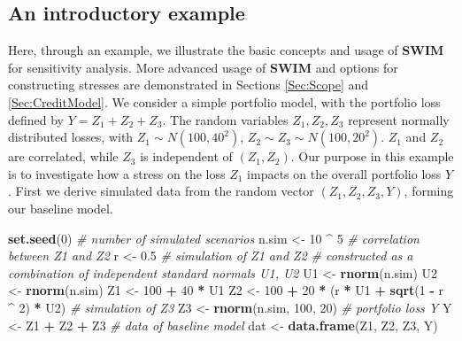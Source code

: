 \documentclass[
]{article}
\newenvironment{Shaded}{\begin{snugshade}}{\end{snugshade}}
\newcommand{\CommentTok}[1]{\textcolor[rgb]{0.56,0.35,0.01}{\textit{#1}}}
\newcommand{\DecValTok}[1]{\textcolor[rgb]{0.00,0.00,0.81}{#1}}
\newcommand{\FloatTok}[1]{\textcolor[rgb]{0.00,0.00,0.81}{#1}}
\newcommand{\KeywordTok}[1]{\textcolor[rgb]{0.13,0.29,0.53}{\textbf{#1}}}
\newcommand{\NormalTok}[1]{#1}
\newcommand{\OperatorTok}[1]{\textcolor[rgb]{0.81,0.36,0.00}{\textbf{#1}}}
\newcommand{\StringTok}[1]{\textcolor[rgb]{0.31,0.60,0.02}{#1}}
\begin{document}
\hypertarget{an-introductory-example}{%
\subsection{An introductory example}\label{an-introductory-example}}

Here, through an example, we illustrate the basic concepts and usage of \textbf{SWIM} for sensitivity analysis. More advanced usage of \textbf{SWIM} and options for constructing stresses are demonstrated in Sections \ref{Sec:Scope} and \ref{Sec:CreditModel}.
We consider a simple portfolio model, with the portfolio loss defined by \(Y=Z_1+Z_2+Z_3\). The random variables \(Z_1,Z_2,Z_3\) represent normally distributed losses, with \(Z_1\sim N(100,40^2)\), \(Z_2\sim Z_3\sim N(100,20^2)\). \(Z_1\) and \(Z_2\) are correlated, while \(Z_3\) is independent of \((Z_1,Z_2)\). Our purpose in this example is to investigate how a stress on the loss \(Z_1\) impacts on the overall portfolio loss \(Y\).
First we derive simulated data from the random vector \((Z_1,Z_2,Z_3,Y)\), forming our baseline model.

\begin{Shaded}
\begin{Highlighting}[]
\KeywordTok{set.seed}\NormalTok{(}\DecValTok{0}\NormalTok{)}
\CommentTok{\# number of simulated scenarios}
\NormalTok{n.sim \textless{}{-}}\StringTok{ }\DecValTok{10} \OperatorTok{\^{}}\StringTok{ }\DecValTok{5}
\CommentTok{\# correlation between Z1 and Z2}
\NormalTok{r \textless{}{-}}\StringTok{ }\FloatTok{0.5}
\CommentTok{\# simulation of Z1  and Z2}
\CommentTok{\# constructed as a combination of independent standard normals U1, U2}
\NormalTok{U1 \textless{}{-}}\StringTok{ }\KeywordTok{rnorm}\NormalTok{(n.sim)}
\NormalTok{U2 \textless{}{-}}\StringTok{ }\KeywordTok{rnorm}\NormalTok{(n.sim)}
\NormalTok{Z1 \textless{}{-}}\StringTok{ }\DecValTok{100} \OperatorTok{+}\StringTok{ }\DecValTok{40} \OperatorTok{*}\StringTok{ }\NormalTok{U1}
\NormalTok{Z2 \textless{}{-}}\StringTok{ }\DecValTok{100} \OperatorTok{+}\StringTok{ }\DecValTok{20} \OperatorTok{*}\StringTok{ }\NormalTok{(r }\OperatorTok{*}\StringTok{ }\NormalTok{U1 }\OperatorTok{+}\StringTok{ }\KeywordTok{sqrt}\NormalTok{(}\DecValTok{1} \OperatorTok{{-}}\StringTok{ }\NormalTok{r }\OperatorTok{\^{}}\StringTok{ }\DecValTok{2}\NormalTok{) }\OperatorTok{*}\StringTok{ }\NormalTok{U2)}
\CommentTok{\# simulation of Z3}
\NormalTok{Z3 \textless{}{-}}\StringTok{ }\KeywordTok{rnorm}\NormalTok{(n.sim, }\DecValTok{100}\NormalTok{, }\DecValTok{20}\NormalTok{)}
\CommentTok{\# portfolio loss Y}
\NormalTok{Y \textless{}{-}}\StringTok{ }\NormalTok{Z1 }\OperatorTok{+}\StringTok{ }\NormalTok{Z2 }\OperatorTok{+}\StringTok{ }\NormalTok{Z3}
\CommentTok{\# data of baseline model}
\NormalTok{dat \textless{}{-}}\StringTok{ }\KeywordTok{data.frame}\NormalTok{(Z1, Z2, Z3, Y)}
\end{Highlighting}
\end{Shaded}
\end{document}
